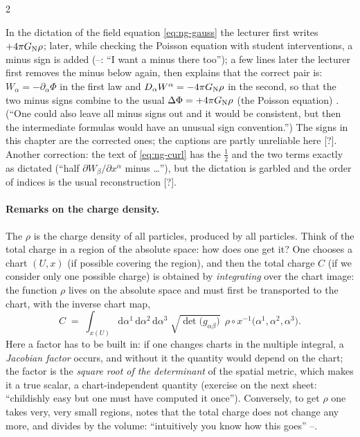 \begin{paracol}{2}
\begin{coursenote}\label{cn:ng-sign}
In the dictation of the field equation \eqref{eq:ng-gauss} the lecturer first writes $+4\pi G_{\rm N}\rho$; later, while checking the Poisson equation with student interventions, a minus sign is added (--: ``I want a minus there too''); a few lines later the lecturer first removes the minus below again,
then explains that the correct pair is: $W_\alpha=-\partial_\alpha\Phi$ in the first law and $D_\alpha W^\alpha=-4\pi G_{\rm N}\rho$ in the second, so that the two minus signs combine to the usual $\Delta\Phi=+4\pi G_{\rm N}\rho$ (the Poisson equation) . (``One could also leave all minus signs out and it would be consistent, but then the intermediate formulas would
have an unusual sign convention.'') The signs in this chapter are the corrected ones; the captions are partly unreliable here [?]. Another correction: the text of \eqref{eq:ng-curl} has the $\tfrac12$ and the two terms exactly as dictated (``half $\partial W_\beta/\partial x^\alpha$ minus \dots''), but the dictation is garbled and the order of indices is the usual reconstruction [?].
\end{coursenote}

\paragraph{Remarks on the charge density.} The $\rho$ is the charge density of all particles, produced by all particles. Think of the total charge in a region of the absolute space: how does one get it? One chooses a chart $(U,x)$ (if possible covering the region), and then the total charge $C$ (if we consider only one possible charge) is obtained by \emph{integrating} over the chart image: the function $\rho$ lives on the absolute space and must first be transported to the chart, with the inverse chart map,
\begin{equation}\label{eq:ng-totalcharge}
  C\;=\;\int_{x(U)}\mathrm d\alpha^1\,\mathrm d\alpha^2\,\mathrm d\alpha^3\;\sqrt{\det\bigl(g_{\alpha\beta}\bigr)}\;\,\rho\circ x^{-1}\bigl(\alpha^1,\alpha^2,\alpha^3\bigr) .
\end{equation}
Here a factor has to be built in: if one changes charts in the multiple integral, a \emph{Jacobian factor} occurs, and without it the quantity would depend on the chart; the factor is the \emph{square root of the determinant} of the spatial metric, which makes it a true scalar, a chart-independent quantity (exercise on the next sheet: ``childishly easy but one must have computed it once'').
Conversely, to get $\rho$ one takes very, very small regions, notes that the total charge does not change any more, and divides by the volume: ``intuitively you know how this goes'' --.


\end{paracol}
